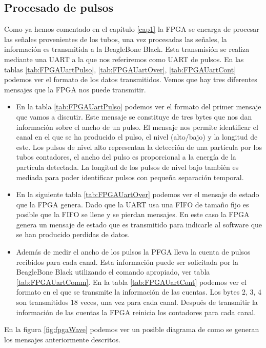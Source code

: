 	\subsection{Procesado de pulsos}
		Como ya hemos comentado en el capítulo \ref{cap1} la FPGA se encarga de procesar las señales provenientes de los tubos, una vez procesadas
		las señales, la información es transmitida a la BeagleBone Black. Esta transmisión se realiza mediante una UART a la que nos referiremos
		como UART de pulsos. En las tablas \ref{tab:FPGAUartPulso}, \ref{tab:FPGAUartOver}, \ref{tab:FPGAUartCont} podemos ver el formato de los
		datos transmitidos. Vemos que hay tres diferentes mensajes que la FPGA nos puede transmitir.
		\begin{itemize}
			\item	En la tabla \ref{tab:FPGAUartPulso} podemos ver el formato del primer mensaje que vamos a discutir. Este mensaje se
			  	constituye de tres bytes que nos dan información sobre el ancho de un pulso. El mensaje nos permite identificar el canal
				en el que se ha producido el pulso, el nivel (alto/bajo) y la longitud de este. Los pulsos de nivel alto representan la
				detección de una partícula por los tubos contadores, el ancho del pulso es proporcional a la energía de la partícula
				detectada. La longitud de los pulsos de nivel bajo también es mediada para poder identificar pulsos con pequeña
				separación temporal.
			\item 	En la siguiente tabla \ref{tab:FPGAUartOver} podemos ver el mensaje de estado que la FPGA genera. Dado que la UART usa
			  	una FIFO de tamaño fijo es posible que la FIFO se llene y se pierdan mensajes. En este caso la FPGA genera un mensaje de
				estado que es transmitido para indicarle al software que se han producido perdidas de datos.
			\item	Además de medir el ancho de los pulsos la PFGA lleva la cuenta de pulsos recibidos para cada canal. Esta información
			  	puede ser solicitada por la BeagleBone Black utilizando el comando apropiado, ver tabla \ref{tab:FPGAUartComm}. En la
				tabla \ref{tab:FPGAUartCont} podemos ver el formato en el que se transmite la información de las cuentas. Los bytes
				2, 3, 4 son transmitidos 18 veces, una vez para cada canal. Después de transmitir la información de las cuentas la FPGA
				reinicia los contadores para cada canal.
		\end{itemize}
		En la figura \ref{fig:fpgaWave} podemos ver un posible diagrama de como se generan los mensajes anteriormente descritos.

